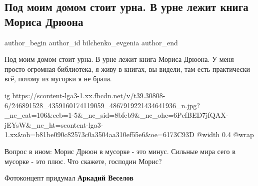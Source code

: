  
 
 
 
 
 
\subsection{Под моим домом стоит урна. В урне лежит книга Мориса Дрюона}
\label{sec:19_10_2021.fb.bilchenko_evgenia.3.moris_drjuon_kniga_musorka}
 
\ifcmt
 author_begin
   author_id bilchenko_evgenia
 author_end
\fi

Под моим домом стоит урна. В урне лежит книга Мориса Дрюона. У меня просто
огромная библиотека, я живу в книгах, вы видели, там есть практически всё,
потому из мусорки я не брала.

\ifcmt
  ig https://scontent-lga3-1.xx.fbcdn.net/v/t39.30808-6/246891528_4359160174119059_4867919221434641936_n.jpg?_nc_cat=106&ccb=1-5&_nc_sid=8bfeb9&_nc_ohc=6PcfBED7jfQAX-jEYsW&_nc_ht=scontent-lga3-1.xx&oh=b81be090c82573c0a3504aa310ef55e6&oe=6173C93D
  @width 0.4
  @wrap 
\fi

Вопрос в ином: Морис Дрюон в мусорке - это минус. Сильные мира сего в мусорке -
это плюс. Что скажете, господин Морис? 

Фотоконцепт придумал \textbf{Аркадий Веселов}

